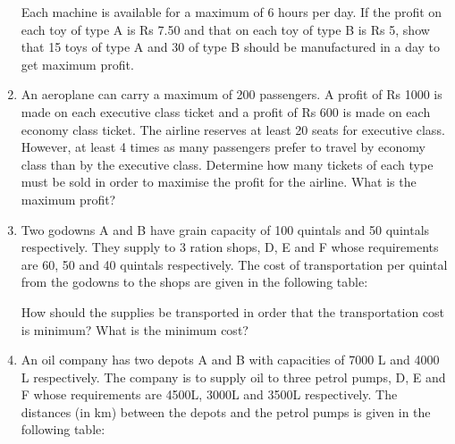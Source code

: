 \begin{enumerate}[label=\thesection.\arabic*,ref=\thesection.\theenumi]
\begin{table}[h]
\centering

\caption{}
\end{table}

Each machine is available for a maximum of 6 hours per day. If the profit on each toy of type A is Rs 7.50 and that on each toy of type B is Rs 5, show that 15 toys of type A and 30 of type B should be manufactured in a day to get maximum profit.
\label{12/12/3/4}
\\
\solution


\item An aeroplane can carry a maximum of 200 passengers. A profit of Rs 1000 is made on each executive class ticket and a profit of Rs 600 is made on each
economy class ticket. The airline reserves at least 20 seats for executive class. However, at least 4 times as many passengers prefer to travel by economy class than by the executive class. Determine how many tickets of each type must be sold in order to maximise the profit for the airline. What is the maximum profit?
\label{12/12/3/5}
\\
\solution

\item Two godowns A and B have grain capacity of 100 quintals and 50 quintals respectively. They supply to 3 ration shops, D, E and F whose requirements are 60, 50 and 40 quintals respectively. The cost of transportation per quintal from the godowns to the shops are given in the following table:

\begin{table}[h]
\centering

\caption{}
\end{table}

How should the supplies be transported in order that the transportation cost is minimum? What is the minimum cost?
\label{12/12/3/6}
\\
\solution


\item An oil company has two depots A and B with capacities of 7000 L and 4000 L respectively. The company is to supply oil to three petrol pumps, D, E and F whose requirements are 4500L, 3000L and 3500L respectively. The distances (in km) between the depots and the petrol pumps is given in the following table:

\begin{table}[h]
\centering

\caption{}
\end{table}


\end{enumerate}

